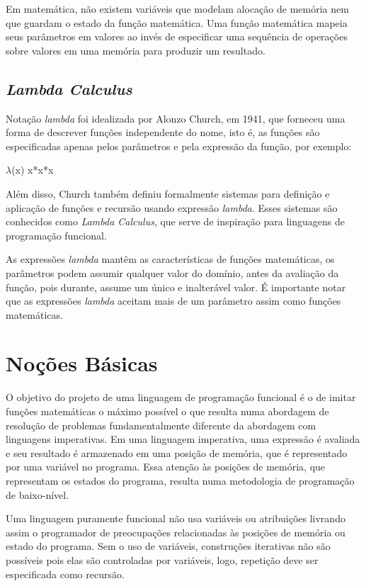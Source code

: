 \documentclass[a4paper, twoside, 12pt]{article}
\begin{document}
Em matemática, não existem variáveis que modelam alocação de memória nem que guardam o estado da função matemática. Uma função matemática mapeia seus parâmetros em valores ao invés de especificar uma sequência de operações sobre valores em uma memória para produzir um resultado.

\subsection{\textit{Lambda Calculus}}

Notação \textit{lambda} foi idealizada por Alonzo Church, em 1941, que forneceu uma forma de descrever funções independente do nome, isto é, as funções são especificadas apenas pelos parâmetros  e pela expressão da função, por exemplo:

\indent\indent		$\lambda$(x) x*x*x

Além disso, Church também definiu formalmente sistemas para definição e aplicação de funções e recursão usando expressão \textit{lambda}. Esses sistemas são conhecidos como \textit{Lambda Calculus}, que serve de inspiração para linguagens de programação funcional.

As expressões \textit{lambda} mantêm as características de funções matemáticas, os parâmetros podem assumir qualquer valor do domínio, antes da avaliação da função, pois durante, assume um único e inalterável valor. É importante notar que as expressões \textit{lambda} aceitam mais de um parâmetro assim como funções matemáticas.

\section{Noções Básicas \label{sec:nocoes-basicas}}

O objetivo do projeto de uma linguagem de programação funcional é o de imitar funções matemáticas o máximo possível o que resulta numa abordagem de resolução de problemas fundamentalmente diferente da abordagem com linguagens imperativas. Em uma linguagem imperativa, uma expressão é avaliada e seu resultado é armazenado em uma posição de memória, que é representado por uma variável no programa. Essa atenção às posições de memória, que representam os estados do programa, resulta numa metodologia de programação de baixo-nível.

Uma linguagem puramente funcional não usa variáveis ou atribuições livrando assim o programador de preocupações relacionadas às posições de memória ou estado do programa. Sem o uso de variáveis, construções iterativas não são possíveis pois elas são controladas por variáveis, logo, repetição deve ser especificada como recursão.
\end{document}
